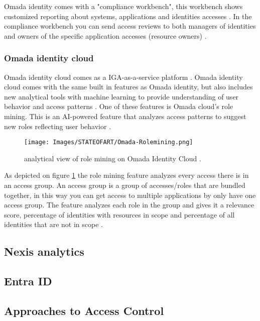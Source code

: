 Omada identity comes with a "compliance workbench", this workbench shows customized reporting about systems, applications and identities accesses \citep{omada}. In the compliance workbench you can send access reviews to both managers of identities and owners of the specific application accesses (resource owners) \citep{omada}.

\subsubsection{Omada identity cloud}
Omada identity cloud comes as a IGA-as-a-service platform \citep{omada}. Omada identity cloud comes with the same built in features as Omada identity, but also includes new analytical tools with machine learning to provide understanding of user behavior and access patterns \citep{omada}. One of these features is Omada cloud's role mining. This is an AI-powered feature that analyzes access patterns to suggest new roles reflecting user behavior \citep{omadaRolemining}.

\begin{figure}[H]
	\centering
	\texttt{[image: Images/STATEOFART/Omada-Rolemining.png]}
	\caption{analytical view of role mining on Omada Identity Cloud \citep{omadaRolemining}. }
	\label{OmadaRolemining}
\end{figure}

As depicted on figure \ref{OmadaRolemining} the role mining feature analyzes every access there is in an access group. An access group is a group of accesses/roles that are bundled together, in this way you can get access to multiple applications by only have one access group. The feature analyzes each role in the group and gives it a relevance score, percentage of identities with resources in scope and percentage of all identities that are not in scope \citep{omadaRolemining}.

\subsection{Nexis analytics}

\subsection{Entra ID}

\subsection{Approaches to Access Control}
